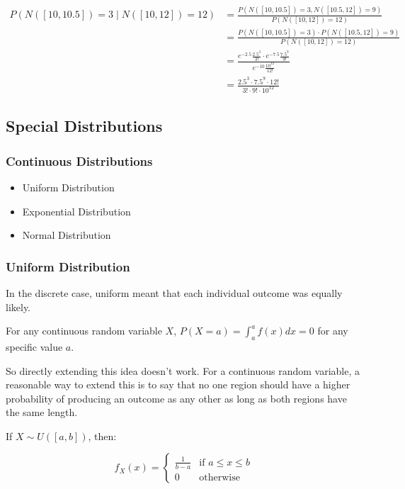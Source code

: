\documentclass{article}
\begin{document}
\begin{enumerate}
     \begin{align*}
         P(N([10, 10.5]) = 3 \mid N([10, 12]) = 12) &= \frac{P(N([10, 10.5]) = 3, N([10.5, 12]) = 9)}{P(N([10, 12]) = 12)} \\[1ex]
         &= \frac{P(N([10, 10.5]) = 3) \cdot P(N([10.5, 12]) = 9)}{P(N([10, 12]) = 12)} \\[1ex]
         &= \frac{e^{-2.5} \frac{2.5^3}{3!} \cdot e^{-7.5} \frac{7.5^9}{9!}}{e^{-10} \frac{10^{12}}{12!}} \\[1ex]
         &= \frac{2.5^3 \cdot 7.5^9 \cdot 12!}{3! \cdot 9! \cdot 10^{12}}
     \end{align*}
    \end{enumerate}

    \subsection*{Special Distributions}

    \subsubsection*{Continuous Distributions}

    \begin{itemize}
        \item Uniform Distribution
        \item Exponential Distribution
        \item Normal Distribution
    \end{itemize}

    \subsubsection*{Uniform Distribution}

    In the discrete case, uniform meant that each individual outcome was equally likely.

    For any continuous random variable $X$, $P(X = a) = \int_{a}^{a} f(x) dx = 0$ for any specific value $a$.

    So directly extending this idea doesn't work. For a continuous random variable, a reasonable way to extend this is to say that no one region should have a higher probability of producing an outcome as any other as long as both regions have the same length.

    If $X \sim U([a, b])$, then:

    \[
    f_X(x) = \begin{cases} 
        \frac{1}{b-a} & \text{if } a \leq x \leq b \\
        0 & \text{otherwise}
    \end{cases}
    \]
\end{document}
